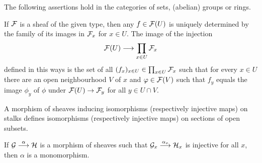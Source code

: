 \documentclass[a4paper,parskip=half,numbers=enddot, DIV=12]{scrreprt}
\begin{document}
\begin{cor}
    The following assertions hold in the categories of sets, (abelian) groups or rings.
    \begin{alphanumerate}
      \item 
        If $\mathcal{F}$ is a sheaf of the given type, then any $f\in\mathcal{F}(U)$ is uniquely determined by the family of its images in $\mathcal{F}_x$ for $x\in U$. The image of the injection 
        \begin{align*}
            \Ff(U) \morphism \prod_{x\in U} \Ff_x
        \end{align*}
        defined in this ways is the set of all $(f_x)_{x\in U}\in\prod_{x\in U}\mathcal{F}_x$ such that for every $x\in U$ there are an open neighbourhood $V$ of $x$ and $\varphi\in \mathcal{F}(V)$ such that $f_y$ equals the image $\phi_y$ of $\phi$ under $\Ff(U)\morphism \Ff_y$ for all $y\in U\cap V$. %
      \item 
        A morphism of sheaves inducing isomorphisms (respectively injective maps) on stalks defines isomorphisms (respectively injective maps) on sections of open subsets. %
      \item
        If $\Gg\morphism[\alpha] \Hh$ is a morphism of sheaves such that $\Gg_x\morphism[\alpha_x] \Hh_x$ is injective for all $x$, then $\alpha$ is a monomorphism. %
    \end{alphanumerate}
\end{cor}
\end{document}

